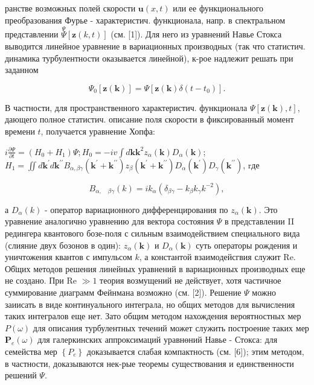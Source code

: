 \documentclass[10pt]{article}
\begin{document}
ранстве возможных полей скорости $\boldsymbol{u}(x, t)$ или ее функционального преобразования Фурье - характеристич. функционала, напр. в спектральном представлении $\stackrel{\Psi}{\Psi}[\boldsymbol{z}(k, t)]$ (см. [1]). Для него из уравнений Навье Стокса выводится линейное уравнение в вариационных производных (так что статистич. динамика турбулентности оказывается линейной), к-рое надлежит решать при заданном



\[

\Psi_{0}[\boldsymbol{z}(\boldsymbol{k})]=\Psi\left[\boldsymbol{z}(\boldsymbol{k}) \delta\left(t-t_{0}\right)\right] .

\]



В частности, для пространственного характеристич. функционала $\Psi[\boldsymbol{z}(\boldsymbol{k}), t]$, дающего полное статистич. описание поля скорости в фиксированный момент времени $t$, получается уравнение Хопфа:



$i \frac{\partial \Psi}{\partial t}=\left(H_{0}+H_{1}\right) \Psi ; H_{0}=-i v \int d \boldsymbol{k} \boldsymbol{k}^{2} z_{\alpha}(\boldsymbol{k}) D_{\alpha}(\boldsymbol{k})$; $H_{1}=\iint d \boldsymbol{k}^{\prime} d \boldsymbol{k}^{\prime \prime} B_{\alpha, \beta \gamma}\left(\boldsymbol{k}^{\prime}+\boldsymbol{k}^{\prime \prime}\right) z_{\beta}\left(\boldsymbol{k}^{\prime}+\boldsymbol{k}^{\prime \prime}\right) D_{\alpha}\left(\boldsymbol{k}^{\prime}\right) D_{\gamma}\left(\boldsymbol{k}^{\prime \prime}\right)$, rде



\[

B_{\alpha, \quad \beta \gamma}(k)=i k_{\alpha}\left(\delta_{\beta \gamma}-k_{\beta} k_{\gamma} k^{-2}\right),

\]



а $D_{\alpha}(k)$ - оператор вариационного дифференцирования по $z_{\alpha}(\boldsymbol{k})$. Это уравнение аналогично уравнению для вектора состояния $\Psi$ в представлении II редингера квантового бозе-поля с сильным взаимодействием специального вида (слияние двух бозонов в один): $z_{\alpha}(\boldsymbol{k})$ и $D_{\alpha}(\boldsymbol{k})$ суть операторы рождения и уничтожения квантов с импульсом $k$, а константой взаимодейсгвия служит Re. Об̈щих методов решения линейных уравнений в вариационных производных еще не создано. При Re $\gg 1$ теория возмущений не действует, хотя частичное суммирование диаграмм Фейнмана возможно (см. [2]). Решение $\Psi$ можно заиисать в виде континуального интеграла, но общих методов для вычисления таких интегралов еще нет. Зато общим методом нахождения вероятностных мер $P(\omega)$ для описания турбулентных течений может служить построение таких мер $\boldsymbol{P}_{e}(\omega)$ для галеркинских аппроксимаций уравнөний Навье - Стокса: для семейства мер $\left\{P_{e}\right\}$ доказывается слабая компактность (см. [6]); этим методом, в частности, доказываются нек-рые теоремы существования и единственности решений $\Psi$.
\end{document}
